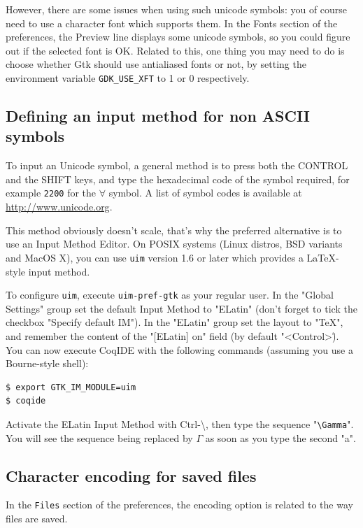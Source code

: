 However, there are some issues when using such unicode symbols: you of
course need to use a character font which supports them. In the Fonts
section of the preferences, the Preview line displays some unicode symbols, so
you could figure out if the selected font is OK. Related to this, one
thing you may need to do is choose whether Gtk should use antialiased
fonts or not, by setting the environment variable \verb|GDK_USE_XFT|
to 1 or 0 respectively.

\subsection{Defining an input method for non ASCII symbols}

To input an Unicode symbol, a general method is to press both the
CONTROL and the SHIFT keys, and type the hexadecimal code of the
symbol required, for example \verb|2200| for the $\forall$ symbol.
A list of symbol codes is available at \url{http://www.unicode.org}. 

This method obviously doesn't scale, that's why the preferred alternative is to
use an Input Method Editor. On POSIX systems (Linux distros, BSD variants and
MacOS X), you can use \texttt{uim} version 1.6 or later which provides a \LaTeX{}-style
input method.

To configure \texttt{uim}, execute \texttt{uim-pref-gtk} as your regular user.
In the "Global Settings" group set the default Input Method to "ELatin" (don't
forget to tick the checkbox "Specify default IM"). In the "ELatin" group set the
layout to "TeX", and remember the content of the "[ELatin] on" field (by default
"<Control>\"). You can now execute CoqIDE with the following commands (assuming
you use a Bourne-style shell):

\begin{verbatim}
$ export GTK_IM_MODULE=uim
$ coqide
\end{verbatim}

Activate the ELatin Input Method with Ctrl-\textbackslash, then type the
sequence "\verb=\Gamma=". You will see the sequence being
replaced by $\Gamma$ as soon as you type the second "a".

\subsection[Character encoding for saved files]{Character encoding for saved files\label{sec:coqidecharencoding}}

In the \texttt{Files} section of the preferences, the encoding option
is related to the way files are saved. 

